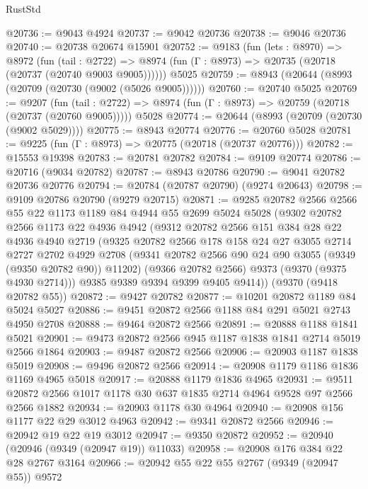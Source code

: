 \begin{lexlean}{RustStd}
\begin{coremodule}
@20736 := @9043 @4924
@20737 := @9042 @20736
@20738 := @9046 @20736
@20740 := @20738 @20674 @15901
@20752 := @9183
    (fun (lets : @8970) =>
    @8972
      (fun (tail : @2722) =>
      @8974 (fun (Γ : @8973) => @20735 (@20718 (@20737 (@20740 @9003 @9005))))))
    @5025
@20759 := @8943 (@20644 (@8993 (@20709 (@20730 (@9002 (@5026 @9005))))))
@20760 := @20740 @5025
@20769 := @9207
    (fun (tail : @2722) => @8974 (fun (Γ : @8973) => @20759 (@20718 (@20737 (@20760 @9005)))))
    @5028
@20774 := @20644 (@8993 (@20709 (@20730 (@9002 @5029))))
@20775 := @8943 @20774
@20776 := @20760 @5028
@20781 := @9225 (fun (Γ : @8973) => @20775 (@20718 (@20737 @20776)))
@20782 := @15553 @19398
@20783 := @20781 @20782
@20784 := @9109 @20774
@20786 := @20716 (@9034 @20782)
@20787 := @8943 @20786
@20790 := @9041 @20782 @20736 @20776
@20794 := @20784 (@20787 @20790) (@9274 @20643)
@20798 := @9109 @20786 @20790 (@9279 @20715)
@20871 := @9285
    @20782
    @2566
    @2566
    @55
    @22
    @1173
    @1189
    @84
    @4944
    @55
    @2699
    @5024
    @5028
    (@9302
      @20782
      @2566
      @1173
      @22
      @4936
      @4942
      (@9312
        @20782
        @2566
        @151
        @384
        @28
        @22
        @4936
        @4940
        @2719
        (@9325
          @20782
          @2566
          @178
          @158
          @24
          @27
          @3055
          @2714
          @2727
          @2702
          @4929
          @2708
          (@9341 @20782 @2566 @90 @24 @90 @3055 (@9349 (@9350 @20782 @90)) @11202)
          (@9366 @20782 @2566)
          @9373
          (@9370 (@9375 @4930 @2714)))
        @9385
        @9389
        @9394
        @9399
        @9405
        @9414))
    (@9370 (@9418 @20782 @55))
@20872 := @9427 @20782
@20877 := @10201 @20872 @1189 @84 @5024 @5027
@20886 := @9451 @20872 @2566 @1188 @84 @291 @5021 @2743 @4950 @2708
@20888 := @9464 @20872 @2566
@20891 := @20888 @1188 @1841 @5021
@20901 := @9473 @20872 @2566 @945 @1187 @1838 @1841 @2714 @5019 @2566 @1864
@20903 := @9487 @20872 @2566
@20906 := @20903 @1187 @1838 @5019
@20908 := @9496 @20872 @2566
@20914 := @20908 @1179 @1186 @1836 @1169 @4965 @5018
@20917 := @20888 @1179 @1836 @4965
@20931 := @9511 @20872 @2566 @1017 @1178 @30 @637 @1835 @2714 @4964 @9528 @97 @2566 @2566 @1882
@20934 := @20903 @1178 @30 @4964
@20940 := @20908 @156 @1177 @22 @29 @3012 @4963
@20942 := @9341 @20872 @2566
@20946 := @20942 @19 @22 @19 @3012
@20947 := @9350 @20872
@20952 := @20940 (@20946 (@9349 (@20947 @19)) @11033)
@20958 := @20908 @176 @384 @22 @28 @2767 @3164
@20966 := @20942 @55 @22 @55 @2767 (@9349 (@20947 @55)) @9572

\end{coremodule}
\end{lexlean}
